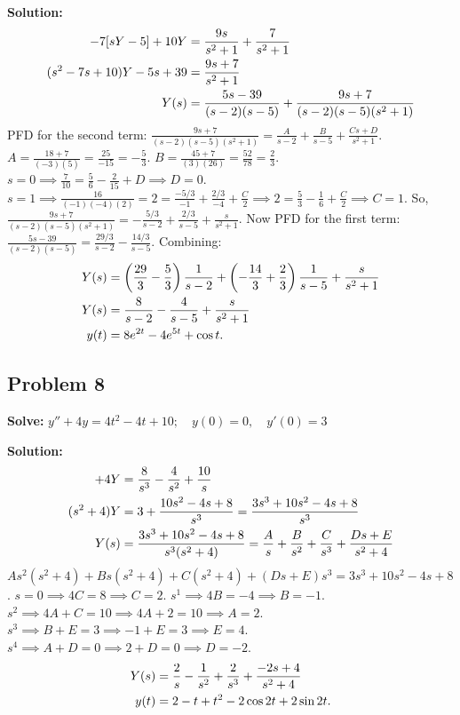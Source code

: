 \documentclass[11pt, letterpaper]{article}
\theoremstyle{definition}
\theoremstyle{remark}
\begin{document}
\textbf{Solution:}
\begin{align*}
[s^2 Y - 5s + 4] - 7[s Y - 5] + 10Y &= \frac{9s}{s^2 + 1} + \frac{7}{s^2 + 1} \\ \relax
(s^2 - 7s + 10)Y - 5s + 39 &= \frac{9s + 7}{s^2 + 1} \\ \relax
Y(s) &= \frac{5s - 39}{(s - 2)(s - 5)} + \frac{9s + 7}{(s - 2)(s - 5)(s^2 + 1)}
\end{align*}
PFD for the second term: $\frac{9s + 7}{(s - 2)(s - 5)(s^2 + 1)} = \frac{A}{s - 2} + \frac{B}{s - 5} + \frac{Cs + D}{s^2 + 1}$.
$A = \frac{18 + 7}{(-3)(5)} = \frac{25}{-15} = -\frac{5}{3}$.
$B = \frac{45 + 7}{(3)(26)} = \frac{52}{78} = \frac{2}{3}$.
$s=0 \implies \frac{7}{10} = \frac{5}{6} - \frac{2}{15} + D \implies D = 0$.
$s=1 \implies \frac{16}{(-1)(-4)(2)} = 2 = \frac{-5/3}{-1} + \frac{2/3}{-4} + \frac{C}{2} \implies 2 = \frac{5}{3} - \frac{1}{6} + \frac{C}{2} \implies C = 1$.
So, $\frac{9s + 7}{(s - 2)(s - 5)(s^2 + 1)} = -\frac{5/3}{s - 2} + \frac{2/3}{s - 5} + \frac{s}{s^2 + 1}$.
Now PFD for the first term: $\frac{5s - 39}{(s - 2)(s - 5)} = \frac{29/3}{s - 2} - \frac{14/3}{s - 5}$.
Combining:
\begin{align*}
Y(s) &= \left( \frac{29}{3} - \frac{5}{3} \right) \frac{1}{s - 2} + \left( -\frac{14}{3} + \frac{2}{3} \right) \frac{1}{s - 5} + \frac{s}{s^2 + 1} \\ \relax
Y(s) &= \frac{8}{s - 2} - \frac{4}{s - 5} + \frac{s}{s^2 + 1} \\ \relax
y(t) &= 8e^{2t} - 4e^{5t} + \cos t.
\end{align*}

\subsection*{Problem 8}
\textbf{Solve:} $y'' + 4y = 4t^2 - 4t + 10 ; \quad y(0) = 0 , \quad y'(0) = 3$

\textbf{Solution:}
\begin{align*}
[s^2 Y - 3] + 4Y &= \frac{8}{s^3} - \frac{4}{s^2} + \frac{10}{s} \\ \relax
(s^2 + 4)Y &= 3 + \frac{10s^2 - 4s + 8}{s^3} = \frac{3s^3 + 10s^2 - 4s + 8}{s^3} \\ \relax
Y(s) &= \frac{3s^3 + 10s^2 - 4s + 8}{s^3(s^2 + 4)} = \frac{A}{s} + \frac{B}{s^2} + \frac{C}{s^3} + \frac{Ds + E}{s^2 + 4}
\end{align*}
$As^2(s^2 + 4) + Bs(s^2 + 4) + C(s^2 + 4) + (Ds + E)s^3 = 3s^3 + 10s^2 - 4s + 8$.
$s=0 \implies 4C = 8 \implies C = 2$.
$s^1 \implies 4B = -4 \implies B = -1$.
$s^2 \implies 4A + C = 10 \implies 4A + 2 = 10 \implies A = 2$.
$s^3 \implies B + E = 3 \implies -1 + E = 3 \implies E = 4$.
$s^4 \implies A + D = 0 \implies 2 + D = 0 \implies D = -2$.
\begin{align*}
Y(s) &= \frac{2}{s} - \frac{1}{s^2} + \frac{2}{s^3} + \frac{-2s + 4}{s^2 + 4} \\ \relax
y(t) &= 2 - t + t^2 - 2\cos 2t + 2\sin 2t.
\end{align*}
\end{document}
